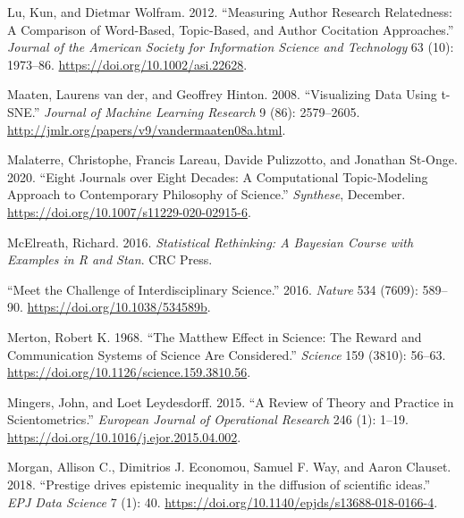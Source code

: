 \documentclass[
  11pt,
]{article}
\newlength{\cslhangindent}
\newenvironment{CSLReferences}[2] %
 {%
  \setlength{\parindent}{0pt}
  \ifodd #1 \everypar{\setlength{\hangindent}{\cslhangindent}}\ignorespaces\fi
  \ifnum #2 > 0
  \setlength{\parskip}{#2\baselineskip}
  \fi
 }%
 {}
\begin{document}
\begin{CSLReferences}{1}{0}
\leavevmode{}%
Lu, Kun, and Dietmar Wolfram. 2012. {``Measuring Author Research Relatedness: A Comparison of Word-Based, Topic-Based, and Author Cocitation Approaches.''} \emph{Journal of the American Society for Information Science and Technology} 63 (10): 1973--86. \url{https://doi.org/10.1002/asi.22628}.

\leavevmode{}%
Maaten, Laurens van der, and Geoffrey Hinton. 2008. {``Visualizing Data Using t-SNE.''} \emph{Journal of Machine Learning Research} 9 (86): 2579--2605. \url{http://jmlr.org/papers/v9/vandermaaten08a.html}.

\leavevmode{}%
Malaterre, Christophe, Francis Lareau, Davide Pulizzotto, and Jonathan St-Onge. 2020. {``Eight Journals over Eight Decades: A Computational Topic-Modeling Approach to Contemporary Philosophy of Science.''} \emph{Synthese}, December. \url{https://doi.org/10.1007/s11229-020-02915-6}.

\leavevmode{}%
McElreath, Richard. 2016. \emph{Statistical Rethinking: A Bayesian Course with Examples in R and Stan}. CRC Press.

\leavevmode{}%
{``Meet the Challenge of Interdisciplinary Science.''} 2016. \emph{Nature} 534 (7609): 589--90. \url{https://doi.org/10.1038/534589b}.

\leavevmode{}%
Merton, Robert K. 1968. {``The Matthew Effect in Science: The Reward and Communication Systems of Science Are Considered.''} \emph{Science} 159 (3810): 56--63. \url{https://doi.org/10.1126/science.159.3810.56}.

\leavevmode{}%
Mingers, John, and Loet Leydesdorff. 2015. {``A Review of Theory and Practice in Scientometrics.''} \emph{European Journal of Operational Research} 246 (1): 1--19. \url{https://doi.org/10.1016/j.ejor.2015.04.002}.

\leavevmode{}%
Morgan, Allison C., Dimitrios J. Economou, Samuel F. Way, and Aaron Clauset. 2018. {``Prestige drives epistemic inequality in the diffusion of scientific ideas.''} \emph{EPJ Data Science} 7 (1): 40. \url{https://doi.org/10.1140/epjds/s13688-018-0166-4}.


\end{CSLReferences}
\end{document}
